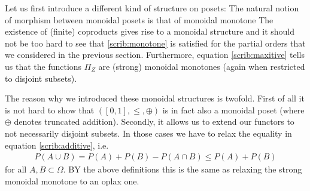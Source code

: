     Let us first introduce a different kind of structure on posets:
    The natural notion of morphism between monoidal posets is that of monoidal monotone
    The existence of (finite) coproducts gives rise to a monoidal structure and it should not be too hard to see that \ref{scrib:monotone} is satisfied for the partial orders that we considered in the previous section. Furthermore, equation \ref{scrib:maxitive} tells us that the functions $\Pi_Z$ are (strong) monoidal monotones (again when restricted to disjoint subsets).

    The reason why we introduced these monoidal structures is twofold. First of all it is not hard to show that $([0, 1], \leq, \oplus)$ is in fact also a monoidal poset (where $\oplus$ denotes truncated addition). Secondly, it allows us to extend our functors to not necessarily disjoint subsets. In those cases we have to relax the equality in equation \ref{scrib:additive}, i.e.
    \begin{gather}
        P(A\cup B) = P(A) + P(B) - P(A\cap B) \leq P(A) + P(B)
    \end{gather}
    for all $A,B\subset\Omega$. BY the above definitions this is the same as relaxing the strong monoidal monotone to an oplax one.

